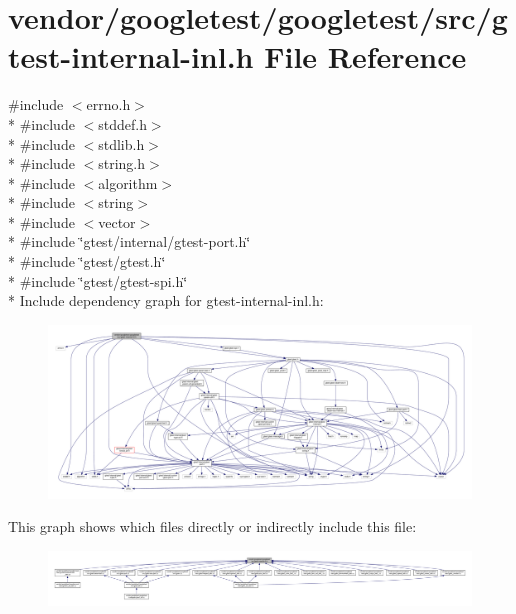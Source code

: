 \hypertarget{gtest-internal-inl_8h}{}\section{vendor/googletest/googletest/src/gtest-\/internal-\/inl.h File Reference}
\label{gtest-internal-inl_8h}
{\ttfamily \#include $<$errno.\+h$>$}\\*
{\ttfamily \#include $<$stddef.\+h$>$}\\*
{\ttfamily \#include $<$stdlib.\+h$>$}\\*
{\ttfamily \#include $<$string.\+h$>$}\\*
{\ttfamily \#include $<$algorithm$>$}\\*
{\ttfamily \#include $<$string$>$}\\*
{\ttfamily \#include $<$vector$>$}\\*
{\ttfamily \#include \char`\"{}gtest/internal/gtest-\/port.\+h\char`\"{}}\\*
{\ttfamily \#include \char`\"{}gtest/gtest.\+h\char`\"{}}\\*
{\ttfamily \#include \char`\"{}gtest/gtest-\/spi.\+h\char`\"{}}\\*
Include dependency graph for gtest-\/internal-\/inl.h\+:\nopagebreak
\begin{figure}[H]
\begin{center}
\leavevmode
\includegraphics[width=350pt]{gtest-internal-inl_8h__incl}
\end{center}
\end{figure}
This graph shows which files directly or indirectly include this file\+:\nopagebreak
\begin{figure}[H]
\begin{center}
\leavevmode
\includegraphics[width=350pt]{gtest-internal-inl_8h__dep__incl}
\end{center}
\end{figure}
